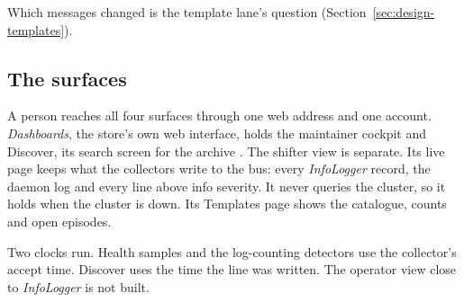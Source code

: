 Which messages changed is the template lane's question (Section~\ref{sec:design-templates}).

\subsection{The surfaces}\label{sec:design-surfaces}

A person reaches all four surfaces through one web address and one account. \textit{Dashboards}, the store's own web interface, holds the maintainer cockpit and Discover, its search screen for the archive \cite{ref:opensearch}. The shifter view is separate. Its live page keeps what the collectors write to the bus: every \textit{InfoLogger} record, the daemon log and every line above info severity. It never queries the cluster, so it holds when the cluster is down. Its Templates page shows the catalogue, counts and open episodes.

Two clocks run. Health samples and the log-counting detectors use the collector's accept time. Discover uses the time the line was written. The operator view close to \textit{InfoLogger} is not built.
